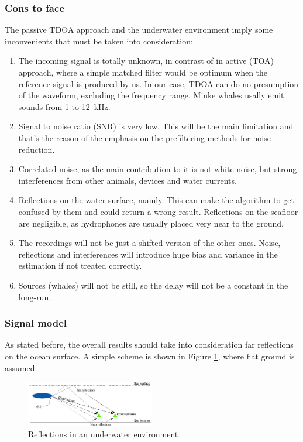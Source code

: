 \subsubsection{Cons to face}
The passive TDOA approach and the underwater environment imply some inconvenients that must be taken into consideration:
\begin{enumerate}
  \item The incoming signal is totally unknown, in contrast of in active (TOA) approach, where a simple matched filter would be optimum when the reference signal is produced by us. In our case, TDOA can do no presumption of the waveform, excluding the frequency range. Minke whales usally emit sounds from 1 to \SI{12}{\kilo\Hz}.
  \item Signal to noise ratio (SNR) is very low. This will be the main limitation and that's the reason of the emphasis on the prefiltering methods for noise reduction.
  \item Correlated noise, as the main contribution to it is not white noise, but strong interferences from other animals, devices and water currents.
  \item Reflections on the water surface, mainly. This can make the algorithm to get confused by them and could return a wrong result. Reflections on the seafloor are negligible, as hydrophones are usually placed very near to the ground.
  \item The recordings will not be just a shifted version of the other ones. Noise, reflections and interferences will introduce huge bias and variance in the estimation if not treated correctly.
  \item Sources (whales) will not be still, so the delay will not be a constant in the long-run.
\end{enumerate}

\vspace{5pt}
\subsubsection{Signal model}
  As stated before, the overall results should take into consideration far reflections on the ocean surface. A simple scheme is shown in Figure \ref{fig:reflections}, where flat ground is assumed.  

  \vspace{5pt}
  \begin{figure}[htb]
	  \begin{center}
		  \includegraphics[width=0.5\textwidth]{figures/model.png}
	  \end{center}
	  \caption{Reflections in an underwater environment}
	  \label{fig:reflections}
  \end{figure}
  
